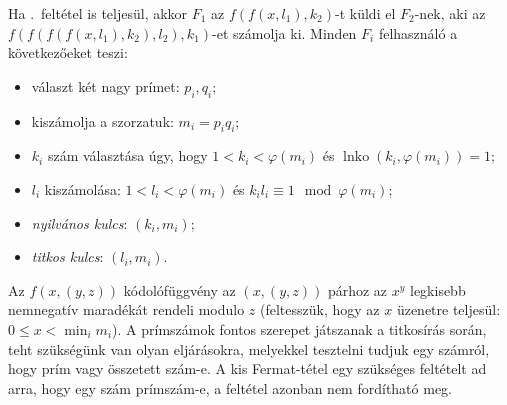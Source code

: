 \documentclass[DIV=15,appendixprefix]{scrreprt}
\theoremstyle{definition}
\theoremstyle{remark}
\DeclareMathOperator{\lnko}{lnko}
\begin{document}
Ha .~feltétel is teljesül, akkor $ F_{ 1 } $ az $ f \left( f \left( x,{} l_{ 1 }
\right), {} k_{ 2 } \right) $-t küldi el $F_{ 2 } $-nek, aki az $ f \left( f \left( f \left( f
\left( x,{} l_{ 1 } \right), {} k_{ 2 } \right),{} l_{ 2 } \right),{} k_{ 1 } \right) $-et számolja
ki.
%
Minden $ F_{ i } $ felhasználó a következőeket teszi:
\begin{itemize}
	\item választ két nagy prímet: $ p_{ i },{} q_{ i }$;
	\item kiszámolja a szorzatuk: $ m_{ i } =  p_{ i } q_{ i } $;
	\item $ k_{ i } $ szám választása úgy, hogy $ 1 < k_{ i } < \varphi \left( m_{ i } \right) $ és
		$\lnko \left( k_{ i },{} \varphi \left( m_{ i } \right) \right) = 1 $;
	\item $ l_{ i } $ kiszámolása: $ 1 < l_{ i } < \varphi \left( m_{ i } \right) $ és $ k_{ i }
		l_{ i } \equiv 1 \mod{ \varphi \left( m_{ i } \right) }$;
	\item \emph{nyilvános kulcs}: $ \left( k_{ i },{} m_{ i } \right) $;
	\item \emph{titkos kulcs}: $ \left( l_{ i },{} m_{ i } \right) $.
\end{itemize}
Az $ f \left( x,{} \left( y,{} z \right) \right) $ kódolófüggvény az $ \left( x,{} \left( y,{} z
\right) \right) $ párhoz az $ x^{ y } $ legkisebb nemnegatív maradékát rendeli modulo $ z $
(feltesszük, hogy az $ x $ üzenetre teljesül: $ 0 \le x < \min_{ i } m_{ i } $).
%
A prímszámok fontos szerepet játszanak a titkosírás során, teht szükségünk van olyan eljárásokra,
melyekkel tesztelni tudjuk egy számról, hogy prím vagy összetett szám-e. A kis Fermat-tétel egy
szükséges feltételt ad arra, hogy egy szám prímszám-e, a feltétel azonban nem fordítható meg.
\end{document}
